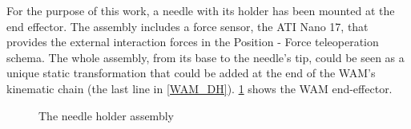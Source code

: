 For the purpose of this work, a needle with its holder has been mounted at the end effector.
The assembly includes a force sensor, the ATI Nano 17, that provides the external interaction forces in the Position - Force teleoperation schema.
The whole assembly, from its base to the needle's tip, could be seen as a unique static transformation that could be added at the end of the WAM's kinematic chain (the last line in \tablename{ \ref{WAM_DH}}).
\figurename{ \ref{fig:EE2}} shows the WAM end-effector.
\begin{figure}
	\caption[The needle holder assembly]{The needle holder assembly}
	\label{fig:EE2}
\end{figure}

